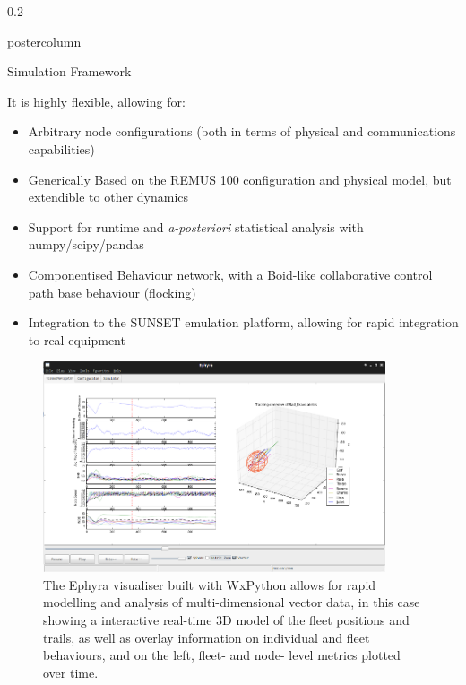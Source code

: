 \documentclass[final,hyperref={pdfpagelabels=false}]{beamer}
\def\colwidth{0.2\linewidth}
\begin{document}
\begin{frame}[fragile]
\begin{columns}[T]
\begin{column}{\colwidth}
\begin{beamercolorbox}[center,wd=\textwidth]{postercolumn}
\begin{minipage}[T]{.98\textwidth}
{\begin{block}{Simulation Framework}
            \vspace{0.3\baselineskip}

            It is highly flexible, allowing for:
            \begin{itemize}
              \item Arbitrary node configurations (both in terms of physical and communications capabilities)
              \item Generically Based on the REMUS 100 configuration and physical model, but extendible to other dynamics
              \item Support for runtime and \emph{a-posteriori} statistical analysis with numpy/scipy/pandas
              \item Componentised Behaviour network, with a Boid-like collaborative control path base behaviour (flocking)
              \item Integration to the SUNSET emulation platform, allowing for rapid integration to real equipment
            \end{itemize}
            \vspace{\lineskip}
            \begin{figure}
              \includegraphics[width=0.9\textwidth]{figures/ephyra_vis}
              \caption{The Ephyra visualiser built with WxPython allows for rapid modelling and analysis of multi-dimensional vector data, in this case showing a interactive real-time 3D model of the fleet positions and trails, as well as overlay information on individual and fleet behaviours, and on the left, fleet- and node- level metrics plotted over time.}
              \label{fig:Ephyra}
            \end{figure}
          \end{block}     
          \fi
            
}
\end{minipage}
\end{beamercolorbox}
\end{column}
\end{columns}
\end{frame}
\end{document}
